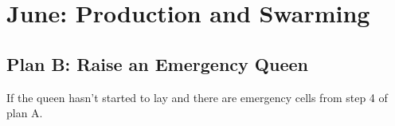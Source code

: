 \section{June: Production and Swarming}


\subsection{Plan B: Raise an Emergency Queen}

If the queen hasn't started to lay and there are emergency cells from step 4 of plan A.




